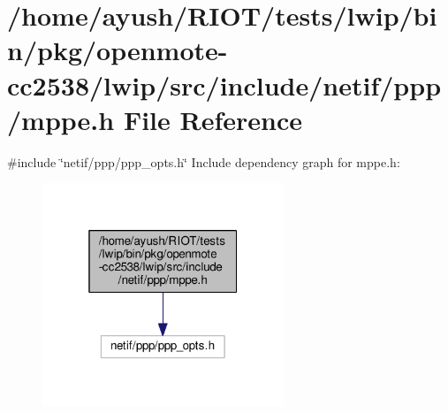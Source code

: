 \hypertarget{openmote-cc2538_2lwip_2src_2include_2netif_2ppp_2mppe_8h}{}\section{/home/ayush/\+R\+I\+O\+T/tests/lwip/bin/pkg/openmote-\/cc2538/lwip/src/include/netif/ppp/mppe.h File Reference}
\label{openmote-cc2538_2lwip_2src_2include_2netif_2ppp_2mppe_8h}
{\ttfamily \#include \char`\"{}netif/ppp/ppp\+\_\+opts.\+h\char`\"{}}\newline
Include dependency graph for mppe.\+h\+:
\nopagebreak
\begin{figure}[H]
\begin{center}
\leavevmode
\includegraphics[width=205pt]{openmote-cc2538_2lwip_2src_2include_2netif_2ppp_2mppe_8h__incl}
\end{center}
\end{figure}
